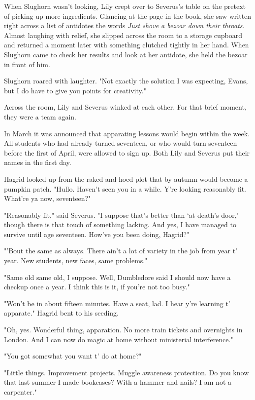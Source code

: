 When Slughorn wasn't looking, Lily crept over to Severus's table on the pretext of picking up more ingredients. Glancing at the page in the book, she saw written right across a list of antidotes the words \emph{Just shove a bezoar down their throats.} Almost laughing with relief, she slipped across the room to a storage cupboard and returned a moment later with something clutched tightly in her hand. When Slughorn came to check her results and look at her antidote, she held the bezoar in front of him.

Slughorn roared with laughter. "Not exactly the solution I was expecting, Evans, but I do have to give you points for creativity."

Across the room, Lily and Severus winked at each other. For that brief moment, they were a team again.

In March it was announced that apparating lessons would begin within the week. All students who had already turned seventeen, or who would turn seventeen before the first of April, were allowed to sign up. Both Lily and Severus put their names in the first day.

Hagrid looked up from the raked and hoed plot that by autumn would become a pumpkin patch. "Hullo. Haven't seen you in a while. Y're looking reasonably fit. What're ya now, seventeen?"

"Reasonably fit," said Severus. "I suppose that's better than `at death's door,' though there is that touch of something lacking. And yes, I have managed to survive until age seventeen. How've you been doing, Hagrid?"

"'Bout the same as always. There ain't a lot of variety in the job from year t' year. New students, new faces, same problems."

"Same old same old, I suppose. Well, Dumbledore said I should now have a checkup once a year. I think this is it, if you're not too busy."

"Won't be in about fifteen minutes. Have a seat, lad. I hear y're learning t' apparate." Hagrid bent to his seeding.

"Oh, yes. Wonderful thing, apparation. No more train tickets and overnights in London. And I can now do magic at home without ministerial interference."

"You got somewhat you want t' do at home?"

"Little things. Improvement projects. Muggle awareness protection. Do you know that last summer I made bookcases? With a hammer and nails? I am not a carpenter."

